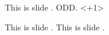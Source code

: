\documentclass{beamer}
\makeatletter
\newcommand{\insertonodd}{%
    \ifodd\the\beamer@slideinframe
        This is slide \insertslideinframe. ODD.
    \else
        \only<\numexpr\insertslideinframe+1\relax>{}
    \fi
}
\newcommand{\insertslideinframe}{\the\beamer@slideinframe}
\makeatother
\begin{document}
\begin{frame}

\insertonodd

  {This is slide \insertslideinframe.}
  {This is slide \insertslideinframe.}
\end{frame}
\end{document}
